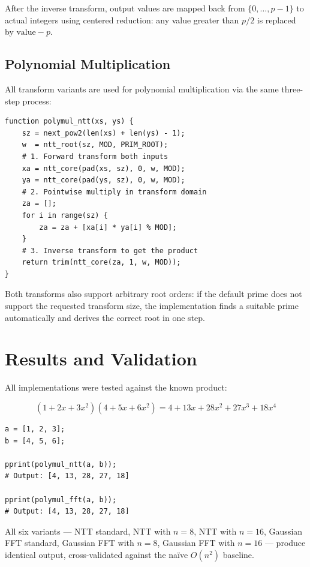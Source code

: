 \documentclass[conference]{IEEEtran}
\begin{document}
After the inverse transform, output values are mapped back from $\{0, \dots, p-1\}$ to actual integers using centered reduction: any value greater than $p/2$ is replaced by $\text{value} - p$.

\subsection{Polynomial Multiplication}

All transform variants are used for polynomial multiplication via the same three-step process:

\begin{lstlisting}
function polymul_ntt(xs, ys) {
    sz = next_pow2(len(xs) + len(ys) - 1);
    w  = ntt_root(sz, MOD, PRIM_ROOT);
    # 1. Forward transform both inputs
    xa = ntt_core(pad(xs, sz), 0, w, MOD);
    ya = ntt_core(pad(ys, sz), 0, w, MOD);
    # 2. Pointwise multiply in transform domain
    za = [];
    for i in range(sz) {
        za = za + [xa[i] * ya[i] % MOD];
    }
    # 3. Inverse transform to get the product
    return trim(ntt_core(za, 1, w, MOD));
}
\end{lstlisting}

Both transforms also support arbitrary root orders: if the default prime does not support the requested transform size, the implementation finds a suitable prime automatically and derives the correct root in one step.

\section{Results and Validation}

All implementations were tested against the known product:

\begin{equation}
(1 + 2x + 3x^2)(4 + 5x + 6x^2) = 4 + 13x + 28x^2 + 27x^3 + 18x^4
\end{equation}

\begin{lstlisting}
a = [1, 2, 3];
b = [4, 5, 6];

pprint(polymul_ntt(a, b));
# Output: [4, 13, 28, 27, 18]

pprint(polymul_fft(a, b));
# Output: [4, 13, 28, 27, 18]
\end{lstlisting}

All six variants — NTT standard, NTT with $n=8$, NTT with $n=16$, Gaussian FFT standard, Gaussian FFT with $n=8$, Gaussian FFT with $n=16$ — produce identical output, cross-validated against the na\"{i}ve $O(n^2)$ baseline.
\end{document}

